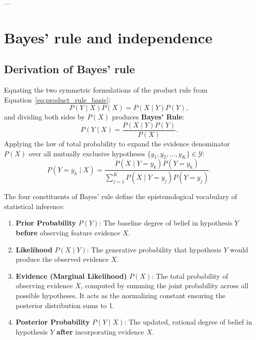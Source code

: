 ---

\section{Bayes' rule and independence}
\label{sec:bayes_rule_and_paradoxes}

\subsection{Derivation of Bayes' rule}
\label{sec:bayes_rule_derivation}

Equating the two symmetric formulations of the product rule from Equation~\eqref{eq:product_rule_basic}:
\begin{equation}
P(Y \mid X) P(X) = P(X \mid Y) P(Y),
\end{equation}
and dividing both sides by $P(X)$ produces \textbf{Bayes' Rule}:
\begin{equation}
P(Y \mid X) = \frac{P(X \mid Y) P(Y)}{P(X)}.
\label{eq:bayes_rule_classic}
\end{equation}
Applying the law of total probability to expand the evidence denominator $P(X)$ over all mutually exclusive hypotheses $\{y_1, y_2, \dots, y_K\} \in \mathcal{Y}$:
\begin{equation}
P(Y = y_k \mid X) = \frac{P(X \mid Y = y_k) P(Y = y_k)}{\sum_{j=1}^K P(X \mid Y = y_j) P(Y = y_j)}.
\label{eq:bayes_rule_expanded}
\end{equation}

The four constituents of Bayes' rule define the epistemological vocabulary of statistical inference:
\begin{enumerate}
  \item \textbf{Prior Probability} $P(Y)$: The baseline degree of belief in hypothesis $Y$ \textbf{before} observing feature evidence $X$.
  \item \textbf{Likelihood} $P(X \mid Y)$: The generative probability that hypothesis $Y$ would produce the observed evidence $X$.
  \item \textbf{Evidence (Marginal Likelihood)} $P(X)$: The total probability of observing evidence $X$, computed by summing the joint probability across all possible hypotheses. It acts as the normalizing constant ensuring the posterior distribution sums to 1.
  \item \textbf{Posterior Probability} $P(Y \mid X)$: The updated, rational degree of belief in hypothesis $Y$ \textbf{after} incorporating evidence $X$.
\end{enumerate}


